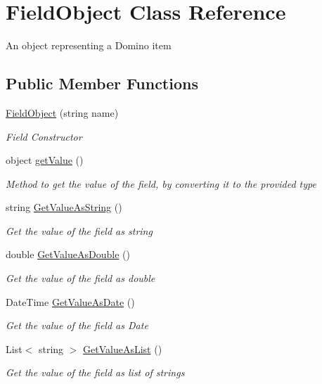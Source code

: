 \hypertarget{class_field_object}{}\section{Field\+Object Class Reference}
\label{class_field_object}


An object representing a Domino item  


\subsection*{Public Member Functions}
\begin{DoxyCompactItemize}
\item 
\hyperlink{class_field_object_a87d8d3f1a36d94dec64e8e467950074b}{Field\+Object} (string name)
\begin{DoxyCompactList}\small\item\em Field Constructor \end{DoxyCompactList}\item 
object \hyperlink{class_field_object_a8d962cda039f78f485232bd2764176c4}{get\+Value} ()
\begin{DoxyCompactList}\small\item\em Method to get the value of the field, by converting it to the provided type \end{DoxyCompactList}\item 
string \hyperlink{class_field_object_ad223b04d429de4b2c57838ffb41d124b}{Get\+Value\+As\+String} ()
\begin{DoxyCompactList}\small\item\em Get the value of the field as string \end{DoxyCompactList}\item 
double \hyperlink{class_field_object_aafe2b7d3e7d414345d85e19dddce3c47}{Get\+Value\+As\+Double} ()
\begin{DoxyCompactList}\small\item\em Get the value of the field as double \end{DoxyCompactList}\item 
Date\+Time \hyperlink{class_field_object_a797ebc6615a86bafd9bd17f09562f2ee}{Get\+Value\+As\+Date} ()
\begin{DoxyCompactList}\small\item\em Get the value of the field as Date \end{DoxyCompactList}\item 
List$<$ string $>$ \hyperlink{class_field_object_a635d7598cbf7bbc29821cb1c012de964}{Get\+Value\+As\+List} ()
\begin{DoxyCompactList}\small\item\em Get the value of the field as list of strings \end{DoxyCompactList}\end{DoxyCompactItemize}
